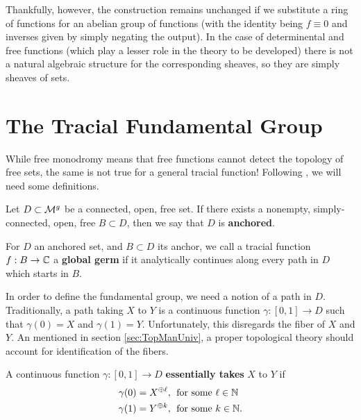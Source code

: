 Thankfully, however, the construction remains unchanged if we substitute a ring
of functions for an abelian group of functions (with the identity being
\(f \equiv 0\) and inverses given by simply negating the output). In the case of
determinental and free functions (which play a lesser role in the theory to be
developed) there is not a natural algebraic structure for the corresponding
sheaves, so they are simply sheaves of sets.

\section{The Tracial Fundamental Group}%
\label{sec:trpi1}

While free monodromy means that free functions cannot detect the topology of
free sets, the same is not true for a general tracial
function! Following \cite{pascoeFreeNoncommutativePrincipal2020}, we will need
some definitions.

\begin{definition}[Anchored]%
  \label{def:anchored}
Let \(D \subset \mathcal{M}^{g} \) be a connected, open, free set. If there exists a
nonempty, simply-connected, open, free \(B \subset D\), then we say that \(D\)
is \textbf{anchored}.
\end{definition}

\begin{definition}
  \label{def:globgerm}
  For \(D\) an anchored set, and \(B \subset D\) its anchor, we call a tracial
  function \(f:B\to \mathbb{C} \) a \textbf{global germ} if it analytically continues
  along every path in \(D\) which starts in \(B\).
\end{definition}

In order to define the fundamental group, we need a notion of a path in \(D\).
Traditionally, a path taking \(X\) to \(Y\) is a continuous function
\(\gamma: [0,1]\to D\) such that \(\gamma(0)=X\) and \(\gamma(1)=Y\).
Unfortunately, this disregards the fiber of \(X\) and \(Y\). An mentioned in
section \ref{sec:TopManUniv}, a proper topological theory should account for
identification of the fibers.

\begin{definition}
  \label{def:esspath}
  A continuous function \(\gamma:[0,1]\to D\) \textbf{essentially takes} \(X\) to \(Y\) if
  \begin{align*}
    \gamma(0) = X^{\oplus \ell},& \;\text{ for some \(\ell \in \mathbb{N}\)}\\
    \gamma(1) = Y^{\oplus k},& \;\text{ for some \(k \in \mathbb{N}\)}.
  \end{align*}
\end{definition}

